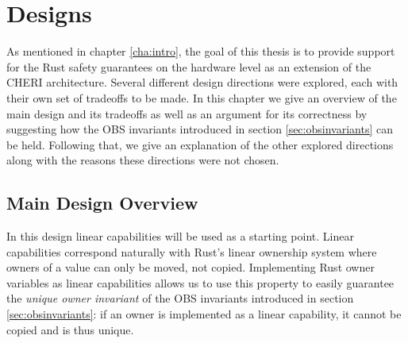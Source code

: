 \newcommand{\V}[1]{\ensuremath{\mathit{#1}}}
\newcommand{\X}[1]{\ensuremath{\mathrm{#1}}}
\newcommand{\Sf}[1]{\ensuremath{\mathsf{#1}}}
\newcommand{\I}[1]{\ensuremath{\mathtt{#1}}}
\newcommand{\K}[1]{\ensuremath{\mathsf{#1}}}
\newcommand{\instr}[1]{\texttt{#1}}
\newcommand{\Z}{\mathbb{Z}}
\newcommand{\confv}{\varphi}
\newcommand{\uninitCol}{RoyalBlue}
\newcommand{\locCol}{RedOrange}
\newcommand{\hlnew}[1]{{\color{\uninitCol}#1}}
\newcommand{\hlnewl}[1]{{\color{\locCol}#1}}
\newcommand{\emphc}[1]{{\color{red}#1}}
\newcommand{\updc}[1]{#1}
\newcommand{\pc}{\K{pc}}
\newcommand{\rgen}[1]{\K{r_{\X{#1}}}}
\newcommand\RW{\perm{rw}}
\newcommand\RWX{\perm{rwx}}
\newcommand\RWL{\perm{rwl}}
\newcommand\RWLX{\perm{rwlx}}
\newcommand\URW{\perm{urw}}
\newcommand\URWX{\perm{urwx}}
\newcommand\URX{\perm{urx}}
\newcommand\URWL{\perm{urwl}}
\newcommand\URWLX{\perm{urwlx}}
\newcommand\RO{\perm{ro}}
\newcommand\RX{\perm{rx}}
\newcommand\enter{\perm{e}}
\newcommand{\instrsem}[1]{\llbracket #1 \rrbracket}
\newcommand{\permflowsto}{\preccurlyeq}
\newcommand{\permflowsfrom}{\succcurlyeq}
\newcommand{\eqdef}{\triangleq}



\chapter{Designs}
\label{chap:design}
As mentioned in chapter \ref{cha:intro}, the goal of this thesis is to provide support for the Rust safety guarantees on the hardware level as an extension of the CHERI architecture. Several different design directions were explored, each with their own set of tradeoffs to be made. In this chapter we give an overview of the main design and its tradeoffs as well as an argument for its correctness by suggesting how the OBS invariants introduced in section \ref{sec:obsinvariants} can be held. Following that, we give an explanation of the other explored directions along with the reasons these directions were not chosen.

\section{Main Design Overview}
\label{sec:maindesign}
In this design linear capabilities will be used as a starting point. Linear capabilities correspond naturally with Rust's linear ownership system where owners of a value can only be moved, not copied. Implementing Rust owner variables as linear capabilities allows us to use this property to easily guarantee the \textit{unique owner invariant} of the OBS invariants introduced in section \ref{sec:obsinvariants}: if an owner is implemented as a linear capability, it cannot be copied and is thus unique.

